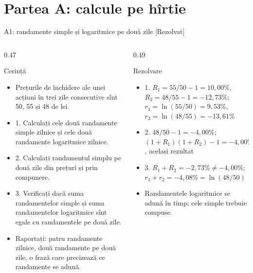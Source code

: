 \section{Partea A: calcule pe hîrtie}

\begin{frame}{A1: randamente simple și logaritmice pe două zile [Rezolvat]}
\itemsize{\footnotesize}
\begin{columns}[T]
\begin{column}{0.47\textwidth}
\begin{block}{Cerință}
\begin{itemize}
    \item Prețurile de închidere ale unei acțiuni în trei zile consecutive sînt 50, 55 și 48 de lei.
    \item 1. Calculați cele două randamente simple zilnice și cele două randamente logaritmice zilnice.
    \item 2. Calculați randamentul simplu pe două zile din prețuri și prin compunere.
    \item 3. Verificați dacă suma randamentelor simple și suma randamentelor logaritmice sînt egale cu randamentele pe două zile.
    \item Raportați: patru randamente zilnice, două randamente pe două zile, o frază care precizează ce randamente se adună.
\end{itemize}
\end{block}
\end{column}
\begin{column}{0.49\textwidth}
\begin{exampleblock}{Rezolvare}
\begin{itemize}
    \item 1. $R_1 = 55/50 - 1 = 10{,}00\%$, $R_2 = 48/55 - 1 = -12{,}73\%$; $r_1 = \ln(55/50) = 9{,}53\%$, $r_2 = \ln(48/55) = -13{,}61\%$
    \item 2. $48/50 - 1 = -4{,}00\%$; $(1 + R_1)(1 + R_2) - 1 = -4{,}00\%$, același rezultat
    \item 3. $R_1 + R_2 = -2{,}73\% \neq -4{,}00\%$; $r_1 + r_2 = -4{,}08\% = \ln(48/50)$
    \item Randamentele logaritmice se adună în timp; cele simple trebuie compuse.
\end{itemize}
\end{exampleblock}
\end{column}
\end{columns}
\end{frame}

